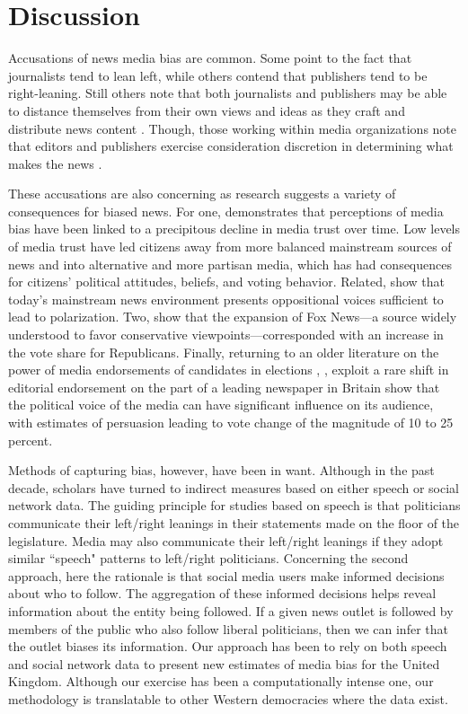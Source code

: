 \documentclass[12pt, letterpaper]{article}
\begin{document}
\section*{Discussion}

Accusations of news media bias are common. Some point to the fact that journalists tend to lean left, while others contend that publishers tend to be right-leaning. Still others note that both journalists and publishers may be able to distance themselves from their own views and ideas as they craft and distribute news content \citep[see][p. 250-258 for an overview]{morton2005}. Though, those working within media organizations note that editors and publishers exercise consideration discretion in determining what makes the news \citep{goldberg2001, orkent2004}.

These accusations are also concerning as research suggests a variety of consequences for biased news. For one, \citet{ladd2011} demonstrates that perceptions of media bias have been linked to a precipitous decline in media trust over time. Low levels of media trust have led citizens away from more balanced mainstream sources of news and into alternative and more partisan media, which has had consequences for citizens' political attitudes, beliefs, and voting behavior. Related, \citet{arceneaux2012} show that today's mainstream news environment presents oppositional voices sufficient to lead to polarization. Two, \citet{dellavigna2007} show that the expansion of Fox News---a source widely understood to favor conservative viewpoints---corresponded with an increase in the vote share for Republicans. Finally, returning to an older literature on the power of media endorsements of candidates in elections \citep[e.g][]{erikson1976}, \citet{ladd2009}, exploit a rare shift in editorial endorsement on the part of a leading newspaper in Britain show that the political voice of the media can have significant influence on its audience, with estimates of persuasion leading to vote change of the magnitude of 10 to 25 percent.

Methods of capturing bias, however, have been in want. Although in the past decade, scholars have turned to indirect measures based on either speech or social network data. The guiding principle for studies based on speech is that politicians communicate their left/right leanings in their statements made on the floor of the legislature. Media may also communicate their left/right leanings if they adopt similar ``speech" patterns to left/right politicians. Concerning the second approach, here the rationale is that social media users make informed decisions about who to follow. The aggregation of these informed decisions helps reveal information about the entity being followed. If a given news outlet is followed by members of the public who also follow liberal politicians, then we can infer that the outlet biases its information. Our approach has been to rely on both speech and social network data to present new estimates of media bias for the United Kingdom. Although our exercise has been a computationally intense one, our methodology is translatable to other Western democracies where the data exist.
\end{document}
